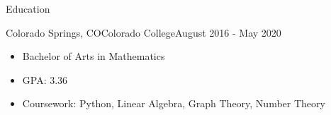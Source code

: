 
\begin{cvsection}{Education}
	\begin{cvsubsection}{Colorado Springs, CO}{Colorado College}{August 2016 - May 2020}
		\begin{itemize}
			\item Bachelor of Arts in Mathematics
			\item GPA: 3.36
			\item Coursework: Python, Linear Algebra, Graph Theory, Number Theory
		\end{itemize}
	\end{cvsubsection}
\end{cvsection}
